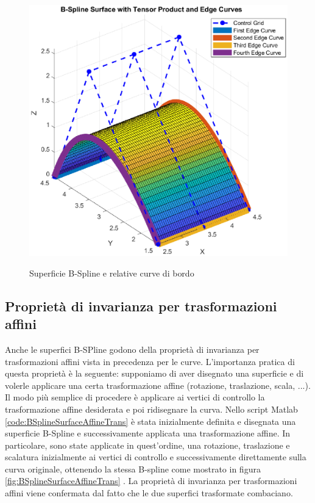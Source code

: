 \documentclass[a4paper, 12pt]{article}
\begin{document}
\begin{figure}[h!]
	\centering
	\caption{Superficie B-Spline e relative curve di bordo}
	\includegraphics[scale=0.7]{surface_tensor_product_plot.eps}
	\label{fig:BSpline_Surface}
\end{figure}

\subsection{Proprietà di invarianza per trasformazioni affini}
Anche le superfici B-SPline godono della proprietà di invarianza per trasformazioni affini vista in precedenza per le curve. L’importanza pratica di questa proprietà è la seguente: supponiamo di aver disegnato una superficie e di volerle
applicare una certa trasformazione affine (rotazione, traslazione, scala, ...). Il modo più semplice di procedere è 
applicare ai vertici di controllo la trasformazione affine desiderata e poi ridisegnare la curva.
Nello script Matlab \ref{code:BSplineSurfaceAffineTrans} è stata inizialmente definita e disegnata una superficie B-Spline e successivamente applicata una trasformazione affine. In particolare, sono state applicate in quest'ordine, una rotazione, traslazione e scalatura inizialmente ai vertici di controllo e successivamente direttamente sulla curva originale, ottenendo la stessa B-spline come mostrato in figura \ref{fig:BSplineSurfaceAffineTrans} .
La proprietà di invarianza per trasformazioni affini viene confermata dal fatto che le due superfici trasformate combaciano.
\end{document}
